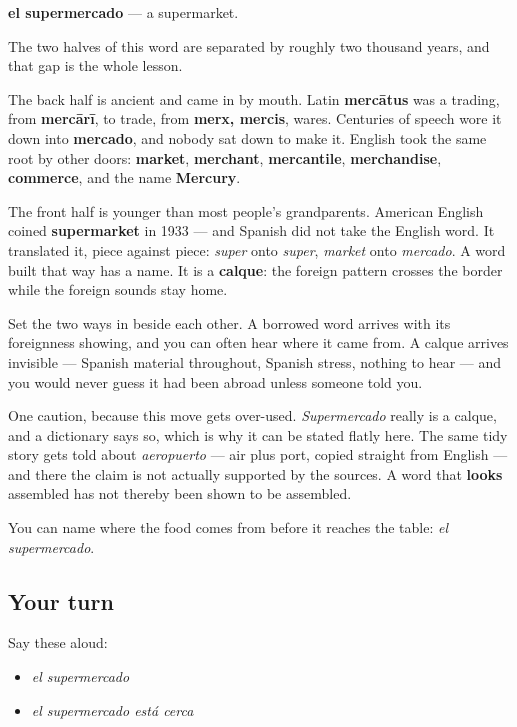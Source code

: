 \begin{cousinweb}
\textbf{el supermercado} — a supermarket.

The two halves of this word are separated by roughly two thousand years, and that gap is the whole lesson.

The back half is ancient and came in by mouth. Latin \textbf{mercātus} was a trading, from \textbf{mercārī}, to trade, from \textbf{merx, mercis}, wares. Centuries of speech wore it down into \textbf{mercado}, and nobody sat down to make it. English took the same root by other doors: \textbf{market}, \textbf{merchant}, \textbf{mercantile}, \textbf{merchandise}, \textbf{commerce}, and the name \textbf{Mercury}.

The front half is younger than most people's grandparents. American English coined \textbf{supermarket} in 1933 — and Spanish did not take the English word. It translated it, piece against piece: \emph{super} onto \emph{super}, \emph{market} onto \emph{mercado}. A word built that way has a name. It is a \textbf{calque}: the foreign pattern crosses the border while the foreign sounds stay home.

Set the two ways in beside each other. A borrowed word arrives with its foreignness showing, and you can often hear where it came from. A calque arrives invisible — Spanish material throughout, Spanish stress, nothing to hear — and you would never guess it had been abroad unless someone told you.

One caution, because this move gets over-used. \emph{Supermercado} really is a calque, and a dictionary says so, which is why it can be stated flatly here. The same tidy story gets told about \emph{aeropuerto} — air plus port, copied straight from English — and there the claim is not actually supported by the sources. A word that \textbf{looks} assembled has not thereby been shown to be assembled.
\end{cousinweb}

\begin{grammarlens}[title={What you've built}]
You can name where the food comes from before it reaches the table: \emph{el supermercado}.
\end{grammarlens}

\subsection*{Your turn}
Say these aloud:

\begin{itemize}
\raggedright
  \item \emph{el supermercado}
  \item \emph{el supermercado está cerca}
\end{itemize}

